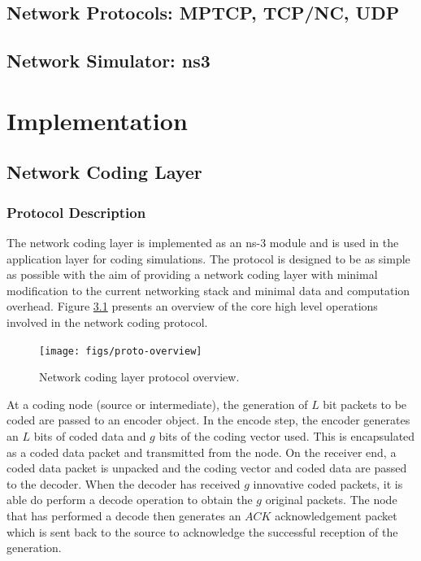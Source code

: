 \documentclass[12pt,a4paper,twoside,openright]{report}
\begin{document}
\section{Network Protocols: MPTCP, TCP/NC, UDP}

\section{Network Simulator: ns3}

\chapter{Implementation} \label{ch:imp}

\section{Network Coding Layer} \label{sec:nclayer}

\subsection{Protocol Description}

The network coding layer is implemented as an ns-3 module and is used in the application layer for coding simulations. The protocol is designed to be as simple as possible with the aim of providing a network coding layer with minimal modification to the current networking stack and minimal data and computation overhead. Figure \ref{fig:proto-overview} presents an overview of the core high level operations involved in the network coding protocol. 

\begin{figure}[tbh]
	\centerline{\texttt{[image: figs/proto-overview]}}
	\caption{Network coding layer protocol overview.}
	\label{fig:proto-overview}
\end{figure}

At a coding node (source or intermediate), the generation of $L$ bit packets to be coded are passed to an encoder object. In the encode step, the encoder generates an $L$ bits of coded data and $g$ bits of the coding vector used. This is encapsulated as a coded data packet and transmitted from the node. On the receiver end, a coded data packet is unpacked and the coding vector and coded data are passed to the decoder. When the decoder has received $g$ innovative coded packets, it is able do perform a decode operation to obtain the $g$ original packets. The node that has performed a decode then generates an $ACK$ acknowledgement packet which is sent back to the source to acknowledge the successful reception of the generation.
\end{document}
